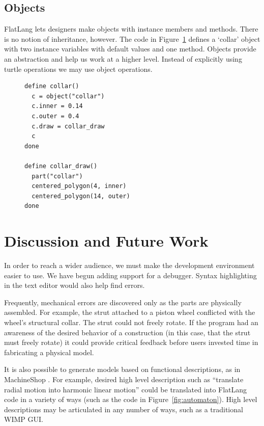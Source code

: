 \documentclass[times, 10pt,twocolumn]{article}
\makeatletter
\newenvironment{subfloat}%
{\def\caption##1{\gdef\subcapsave{\relax##1}}%
\let\subcapsave=\@empty %
\let\sf@oldlabel=\label 
\def\label##1{\xdef\sublabsave{\noexpand\label{##1}}}%
\let\sublabsave\relax %
\setbox\subfigbox\hbox 
\bgroup}%
{\egroup %
\let\label=\sf@oldlabel 
\subfigure[\subcapsave]{\box\subfigbox}}%
\makeatother
\begin{document}
\subsection{Objects}

\nohyphens{FlatLang} lets designers make objects with instance members
and methods. There is no notion of inheritance, however. The code in
Figure~\ref{fig:collar} defines a `collar' object with two instance
variables with default values and one method. Objects provide an
abstraction and help us work at a higher level. Instead of explicitly
using turtle operations we may use object operations.

\begin{figure}
  \begin{subfloat}
    \begin{minipage}{2.6in}
      \small
\begin{verbatim}
define collar()
  c = object("collar")
  c.inner = 0.14
  c.outer = 0.4
  c.draw = collar_draw
  c
done

define collar_draw()
  part("collar")
  centered_polygon(4, inner)
  centered_polygon(14, outer)
done
\end{verbatim}
    \end{minipage}
  \end{subfloat}
  \caption{A collar object, a structural part used in a mechanical
    construction kit.}
  \label{fig:collar}
\end{figure}

\section{Discussion and Future Work}

In order to reach a wider audience, we must make the development
environment easier to use. We have begun adding support for a
debugger. Syntax highlighting in the text editor would also help find
errors.

Frequently, mechanical errors are discovered only as the parts are
physically assembled. For example, the strut attached to a piston
wheel conflicted with the wheel's structural collar. The strut could
not freely rotate. If the program had an awareness of the desired
behavior of a construction (in this case, that the strut must freely
rotate) it could provide critical feedback before users invested time
in fabricating a physical model.

It is also possible to generate models based on functional
descriptions, as in MachineShop \cite{blauvelt-automata}. For example,
desired high level description such as ``translate radial motion into
harmonic linear motion'' could be translated into \nohyphens{FlatLang}
code in a variety of ways (such as the code in
Figure~\ref{fig:automaton}). High level descriptions may be
articulated in any number of ways, such as a traditional WIMP GUI.
\end{document}
